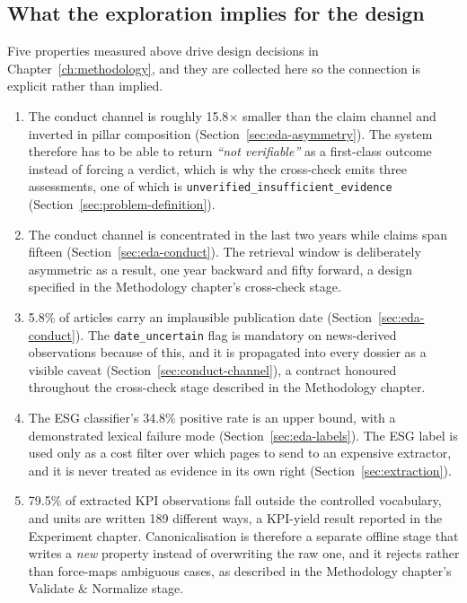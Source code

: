 \documentclass[fontsize=12pt,oneside,headings=small]{scrreprt}
\begin{document}
\subsection{What the exploration implies for the design}
\label{sec:eda-implications}

Five properties measured above drive design decisions in
Chapter~\ref{ch:methodology}, and they are collected here so the connection
is explicit rather than implied.

\begin{enumerate}
  \item The conduct channel is roughly 15.8$\times$ smaller than the
    claim channel and inverted in pillar composition
    (Section~\ref{sec:eda-asymmetry}). The system therefore has to be able to return
    \textit{``not verifiable''} as a first-class outcome instead of forcing a
    verdict, which is why the cross-check emits three assessments, one of which
    is \texttt{unverified\_insufficient\_evidence}
    (Section~\ref{sec:problem-definition}).

  \item The conduct channel is concentrated in the last two years while
    claims span fifteen (Section~\ref{sec:eda-conduct}). The retrieval
    window is deliberately asymmetric as a result, one year backward and
    fifty forward, a design specified in the Methodology chapter's
    cross-check stage.

  \item 5.8\% of articles carry an implausible publication date
    (Section~\ref{sec:eda-conduct}). The \texttt{date\_uncertain} flag
    is mandatory on news-derived observations because of this, and it is
    propagated into every dossier as a visible caveat
    (Section~\ref{sec:conduct-channel}), a contract
    honoured throughout the cross-check stage described in the Methodology
    chapter.

  \item The ESG classifier's 34.8\% positive rate is an upper bound,
    with a demonstrated lexical failure mode (Section~\ref{sec:eda-labels}).
    The ESG label is used only as a cost filter over which pages
    to send to an expensive extractor, and it is never treated as evidence in
    its own right (Section~\ref{sec:extraction}).

  \item 79.5\% of extracted KPI observations fall outside the controlled
    vocabulary, and units are written 189 different ways, a KPI-yield result
    reported in the Experiment chapter. Canonicalisation is therefore a
    separate offline stage that writes a \textit{new} property instead of
    overwriting the raw one, and it rejects rather than force-maps ambiguous
    cases, as described in the Methodology chapter's Validate \& Normalize
    stage.
\end{enumerate}
\end{document}
